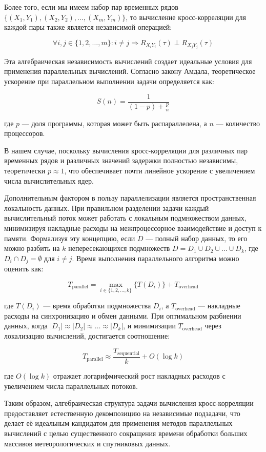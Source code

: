 Более того, если мы имеем набор пар временных рядов $\{(X_1, Y_1), (X_2, Y_2),
	\ldots, (X_m, Y_m)\}$, то вычисление кросс-корреляции для каждой пары также
является независимой операцией:

\[
	\forall i, j \in \{1, 2, \ldots, m\}: i \neq j \Rightarrow R_{X_i Y_i}(\tau) \perp R_{X_j Y_j}(\tau)
\]

Эта алгебраическая независимость вычислений создает идеальные условия для
применения параллельных вычислений. Согласно закону Амдала, теоретическое
ускорение при параллельном выполнении задачи определяется как:

\[
	S(n) = \frac{1}{(1-p) + \frac{p}{n}}
\]

где $p$ — доля программы, которая может быть распараллелена, а $n$ — количество процессоров.

В нашем случае, поскольку вычисления кросс-корреляции для различных пар
временных рядов и различных значений задержки полностью независимы, теоретически
$p \approx 1$, что обеспечивает почти линейное ускорение с увеличением числа
вычислительных ядер.

Дополнительным фактором в пользу параллелизации является пространственная
локальность данных. При правильном разделении задачи каждый вычислительный поток
может работать с локальным подмножеством данных, минимизируя накладные расходы
на межпроцессорное взаимодействие и доступ к памяти. Формализуя эту концепцию,
если $D$ — полный набор данных, то его можно разбить на $k$ непересекающихся
подмножеств $D = D_1 \cup D_2 \cup \ldots \cup D_k$, где $D_i \cap D_j =
	\emptyset$ для $i \neq j$. Время выполнения параллельного алгоритма можно
оценить как:

\[
	T_{\text{parallel}} = \max_{i \in \{1, 2, \ldots, k\}} \{T(D_i)\} + T_{\text{overhead}}
\]

где $T(D_i)$ — время обработки подмножества $D_i$, а $T_{\text{overhead}}$ —
накладные расходы на синхронизацию и обмен данными. При оптимальном разбиении
данных, когда $|D_1| \approx |D_2| \approx \ldots \approx |D_k|$, и минимизации
$T_{\text{overhead}}$ через локализацию вычислений, достигается соотношение:

\[
	T_{\text{parallel}} \approx \frac{T_{\text{sequential}}}{k} + O(\log k)
\]

где $O(\log k)$ отражает логарифмический рост накладных расходов с увеличением
числа параллельных потоков.

Таким образом, алгебраическая структура задачи вычисления кросс-корреляции
предоставляет естественную декомпозицию на независимые подзадачи, что делает её
идеальным кандидатом для применения методов параллельных вычислений с целью
существенного сокращения времени обработки больших массивов метеорологических и
спутниковых данных.


